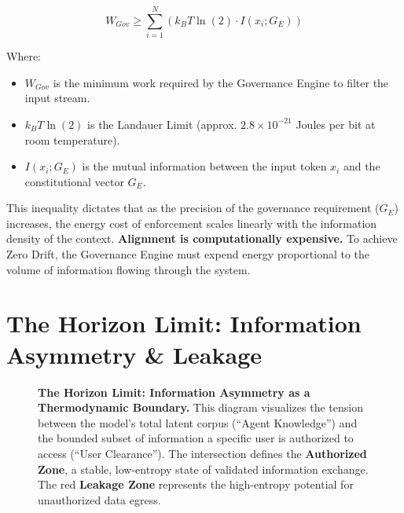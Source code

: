 \documentclass[11pt, a4paper]{article}
\newcommand{\Ge}{G_E}
\newcommand{\Wgov}{W_{Gov}}
\begin{document}
\begin{equation}
    \label{eq:landauer}
    \Wgov \geq \sum_{i=1}^{N} \left( k_B T \ln(2) \cdot I(x_i; \Ge) \right)
\end{equation}

\noindent
Where:
\begin{itemize}
    \item $\Wgov$ is the minimum work required by the Governance Engine to filter the input stream.
    \item $k_B T \ln(2)$ is the Landauer Limit (approx. $2.8 \times 10^{-21}$ Joules per bit at room temperature).
    \item $I(x_i; \Ge)$ is the mutual information \cite{shannon1948} between the input token $x_i$ and the constitutional vector $\Ge$.
\end{itemize}

This inequality dictates that as the precision of the governance requirement ($\Ge$) increases, the energy cost of enforcement scales linearly with the information density of the context. \textbf{Alignment is computationally expensive.} To achieve Zero Drift, the Governance Engine must expend energy proportional to the volume of information flowing through the system.

\section{The Horizon Limit: Information Asymmetry \& Leakage}
\label{sec:horizon_limit}

\begin{figure}[t!]
    \centering
    \resizebox{0.56\textwidth}{!}{}
    \caption[\textbf{The Horizon Limit.}]{\textbf{The Horizon Limit: Information Asymmetry as a Thermodynamic Boundary.} This diagram visualizes the tension between the model's total latent corpus (``Agent Knowledge'') and the bounded subset of information a specific user is authorized to access (``User Clearance''). The intersection defines the \textbf{Authorized Zone}, a stable, low-entropy state of validated information exchange. The red \textbf{Leakage Zone} represents the high-entropy potential for unauthorized data egress.}
    \label{fig:horizon_limit}
\end{figure}
\end{document}

